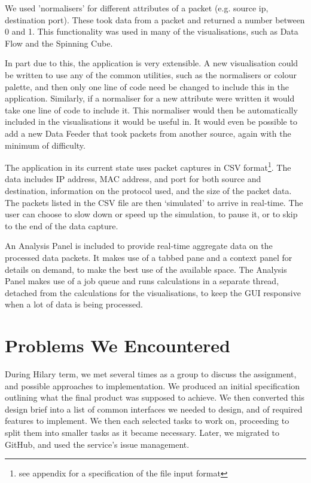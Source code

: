 \documentclass[12pt,a4paper]{article}
\begin{document}
			We used 'normalisers' for different attributes of a packet (e.g. source ip, destination port).  These took data from a packet and returned a number between 0 and 1.  This functionality was used in many of the visualisations, such as Data Flow and the Spinning Cube.

			In part due to this, the application is very extensible.  A new visualisation could be written to use any of the common utilities, such as the normalisers or colour palette, and then only one line of code need be changed to include this in the application.  Similarly, if a normaliser for a new attribute were written it would take one line of code to include it.   This normaliser would then be automatically included in the visualisations it would be useful in.  It would even be possible to add a new Data Feeder that took packets from another source, again with the minimum of difficulty.
			
			The application in its current state uses packet captures in CSV format\footnote{see appendix for a specification of the file input format}. The data includes IP address, MAC address, and port for both source and destination,  information on the protocol used, and the size of the packet data. The packets listed in the CSV file are then `simulated' to arrive in real-time. The user can choose to slow down or speed up the simulation, to pause it, or to skip to the end of the data capture.
			
			An Analysis Panel is included to provide real-time aggregate data on the processed data packets. It makes use of a tabbed pane and a context panel for details on demand, to make the best use of the available space. The Analysis Panel makes use of a job queue and runs calculations in a separate thread, detached from the calculations for the visualisations, to keep the GUI responsive when a lot of data is being processed.

	\section*{Problems We Encountered}
        During Hilary term, we met several times as a group to discuss the assignment, and possible approaches to implementation. We produced an initial specification outlining what the final product was supposed to achieve. We then converted this design brief into a list of common interfaces we needed to design, and of required features to implement. We then each selected tasks to work on, proceeding to split them into smaller tasks as it became necessary. Later, we migrated to GitHub, and used the service's issue management.
		
\end{document}

